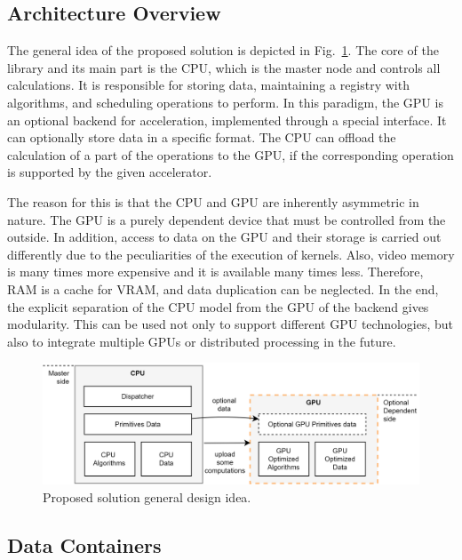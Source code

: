 \subsection{Architecture Overview}

The general idea of the proposed solution is depicted in Fig.~\ref{fig:design}. 
The core of the library and its main part is the CPU, which is the master node and controls all calculations. 
It is responsible for storing data, maintaining a registry with algorithms, and scheduling operations to perform. 
In this paradigm, the GPU is an optional backend for acceleration, implemented through a special interface. 
It can optionally store data in a specific format. 
The CPU can offload the calculation of a part of the operations to the GPU, if the corresponding operation is supported by the given accelerator.

The reason for this is that the CPU and GPU are inherently asymmetric in nature. 
The GPU is a purely dependent device that must be controlled from the outside. In addition, access to data on the GPU and their storage is carried out differently due to the peculiarities of the execution of kernels. 
Also, video memory is many times more expensive and it is available many times less. 
Therefore, RAM is a cache for VRAM, and data duplication can be neglected. 
In the end, the explicit separation of the CPU model from the GPU of the backend gives modularity. 
This can be used not only to support different GPU technologies, but also to integrate multiple GPUs or distributed processing in the future.

\begin{figure}[t]
\centering
\includegraphics[width=1.0\linewidth]{figures/design_idea.png}
\caption{Proposed solution general design idea.}
\label{fig:design}
\end{figure}
    
\subsection{Data Containers}

